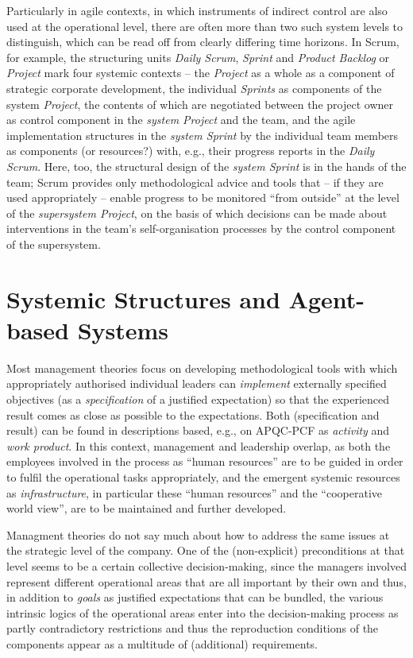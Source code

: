 \documentclass[11pt,a4paper]{article}
\begin{document}
Particularly in agile contexts, in which instruments of indirect control are
also used at the operational level, there are often more than two such system
levels to distinguish, which can be read off from clearly differing time
horizons.  In Scrum, for example, the structuring units \emph{Daily Scrum},
\emph{Sprint} and \emph{Product Backlog} or \emph{Project} mark four systemic
contexts -- the \emph{Project} as a whole as a component of strategic
corporate development, the individual \emph{Sprints} as components of the
system \emph{Project}, the contents of which are negotiated between the
project owner as control component in the \emph{system Project} and the team,
and the agile implementation structures in the \emph{system Sprint} by the
individual team members as components (or resources?) with, e.g., their
progress reports in the \emph{Daily Scrum}. Here, too, the structural design
of the \emph{system Sprint} is in the hands of the team; Scrum provides only
methodological advice and tools that -- if they are used appropriately --
enable progress to be monitored \enquote{from outside} at the level of the
\emph{supersystem Project}, on the basis of which decisions can be made about
interventions in the team's self-organisation processes by the control
component of the supersystem.

\section{Systemic Structures and Agent-based Systems}

Most management theories focus on developing methodological tools with which
appropriately authorised individual leaders can \emph{implement} externally
specified objectives (as a \emph{specification} of a justified expectation) so
that the experienced result comes as close as possible to the expectations.
Both (specification and result) can be found in descriptions based, e.g., on
APQC-PCF as \emph{activity} and \emph{work product}. In this context,
management and leadership overlap, as both the employees involved in the
process as \enquote{human resources} are to be guided in order to fulfil the
operational tasks appropriately, and the emergent systemic resources as
\emph{infrastructure}, in particular these \enquote{human resources} and the
\enquote{cooperative world view}, are to be maintained and further developed.

Managment theories do not say much about how to address the same issues at the
strategic level of the company. One of the (non-explicit) preconditions at
that level seems to be a certain collective decision-making, since the
managers involved represent different operational areas that are all important
by their own and thus, in addition to \emph{goals} as justified expectations
that can be bundled, the various intrinsic logics of the operational areas
enter into the decision-making process as partly contradictory restrictions
and thus the reproduction conditions of the components appear as a multitude
of (additional) requirements.
\end{document}
